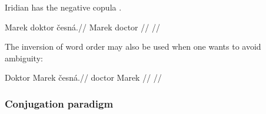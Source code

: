 Iridian has the negative copula .

\pex
\begingl
\gla Marek doktor česná.//
\glb Marek doctor //
\glft {}//
\endgl
\xe

\par The inversion of word order may also be used when one wants to avoid ambiguity:

\pex
\begingl
\gla Doktor Marek česná.//
\glb doctor Marek //
\glft {}//
\endgl
\xe


\subsubsection{Conjugation paradigm}
